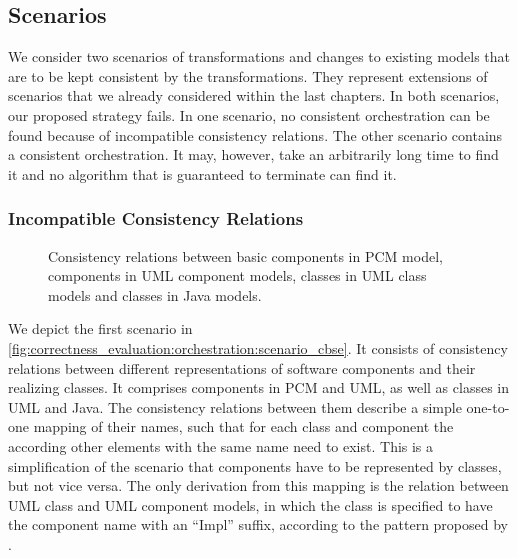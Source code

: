 \subsection{Scenarios}

We consider two scenarios of transformations and changes to existing models that are to be kept consistent by the transformations.
They represent extensions of scenarios that we already considered within the last chapters.
In both scenarios, our proposed strategy fails.
In one scenario, no consistent orchestration can be found because of incompatible consistency relations.
The other scenario contains a consistent orchestration. It may, however, take an arbitrarily long time to find it and no algorithm that is guaranteed to terminate can find it.


\subsubsection*{Incompatible Consistency Relations}

\begin{figure}
    \centering
    
    \caption[Example scenario with incompatibility]{Consistency relations between basic components in \gls{PCM} model, components in \gls{UML} component models, classes in \gls{UML} class models and classes in Java models.}
    \label{fig:correctness_evaluation:orchestration:scenario_cbse}
\end{figure}

We depict the first scenario in \autoref{fig:correctness_evaluation:orchestration:scenario_cbse}.
It consists of consistency relations between different representations of software components and their realizing classes.
It comprises components in \gls{PCM} and \gls{UML}, as well as classes in \gls{UML} and Java.
The consistency relations between them describe a simple one-to-one mapping of their names, such that for each class and component the according other elements with the same name need to exist.
This is a simplification of the scenario that components have to be represented by classes, but not vice versa.
The only derivation from this mapping is the relation between \gls{UML} class and \gls{UML} component models, in which the class is specified to have the component name with an \enquote{Impl} suffix, according to the pattern proposed by \textcite{langhammer2017a}.

